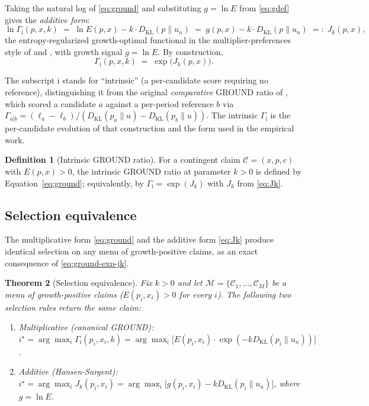 \documentclass[11pt]{article}
\newtheorem{theorem}{Theorem}
\theoremstyle{definition}
\newtheorem{definition}[theorem]{Definition}
\theoremstyle{remark}
\newcommand{\C}{\mathcal{C}}
\newcommand{\G}{g}
\newcommand{\KL}{D_{\mathrm{KL}}}
\newcommand{\GROUND}{\Gamma_{\mathrm{i}}}
\begin{document}
Taking the natural log of \eqref{eq:ground} and substituting
$\G = \ln E$ from \eqref{eq:gdef} gives the \emph{additive form}:
\begin{equation}
\ln \GROUND(p, x, k) \;=\; \ln E(p, x) - k \cdot \KL(p \| u_n)
                       \;=\; \G(p, x) - k \cdot \KL(p \| u_n)
                       \;=:\; J_k(p, x),
\label{eq:Jk}
\end{equation}
the entropy-regularized growth-optimal functional in the
multiplier-preferences style of \citet{hansen2008robustness} and
\citet{maccheroni2006ambiguity}, with growth signal $\G = \ln E$.
By construction,
\begin{equation}
\GROUND(p, x, k) \;=\; \exp\!\bigl(J_k(p, x)\bigr).
\label{eq:ground-exp-jk}
\end{equation}

The subscript $\mathrm{i}$ stands for ``intrinsic'' (a per-candidate
score requiring no reference), distinguishing it from the original
\emph{comparative} GROUND ratio of \citet{mercurio2020}, which scored
a candidate $a$ against a per-period reference $b$ via
$\Gamma_{a|b} = (\ell_a - \ell_b) / (\KL(p_a\|u) - \KL(p_b\|u))$. The
intrinsic $\GROUND$ is the per-candidate evolution of that
construction and the form used in the empirical work.

\begin{definition}[Intrinsic GROUND ratio]\label{def:ground}
For a contingent claim $\C = (x, p, c)$ with $E(p, x) > 0$, the
intrinsic GROUND ratio at parameter $k > 0$ is defined by
Equation~\eqref{eq:ground}; equivalently, by $\GROUND = \exp(J_k)$
with $J_k$ from \eqref{eq:Jk}.
\end{definition}

\subsection{Selection equivalence}\label{sec:hs-link}

The multiplicative form \eqref{eq:ground} and the additive form
\eqref{eq:Jk} produce identical selection on any menu of
growth-positive claims, as an exact consequence of
\eqref{eq:ground-exp-jk}.

\begin{theorem}[Selection equivalence]\label{thm:main}
Fix $k > 0$ and let $\mathcal{M} = \{\C_1, \ldots, \C_M\}$ be a
menu of growth-positive claims ($E(p_i, x_i) > 0$ for every $i$).
The following two selection rules return the same claim:
\begin{enumerate}
    \item Multiplicative (canonical GROUND): $i^\star = \arg\max_{i}
          \GROUND(p_i, x_i, k) = \arg\max_i \bigl[ E(p_i, x_i) \cdot
          \exp(-k \KL(p_i \| u_n)) \bigr]$.
    \item Additive (Hansen-Sargent): $i^\star = \arg\max_{i}
          J_k(p_i, x_i) = \arg\max_i \bigl[ \G(p_i, x_i) - k \KL(p_i \|
          u_n) \bigr]$, where $\G = \ln E$.
\end{enumerate}
\end{theorem}
\end{document}
